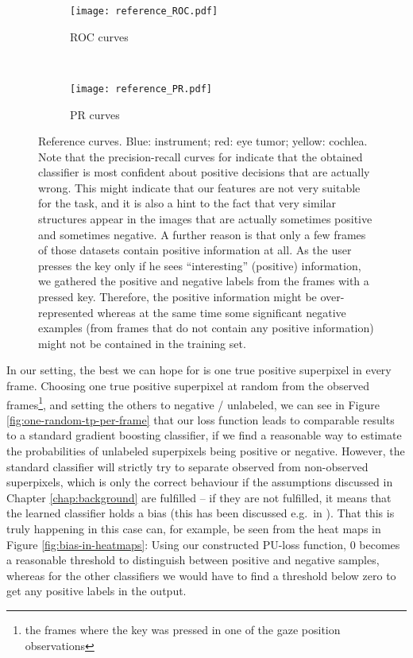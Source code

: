 \begin{figure}[ht]
	\centering
	\begin{subfigure}[h]{0.45\textwidth}
	\texttt{[image: reference\_ROC.pdf]}	
		\caption*{ROC curves}
	\end{subfigure}
	~
	\begin{subfigure}[h]{0.45\textwidth}
	\texttt{[image: reference\_PR.pdf]}	
		\caption*{PR curves}
	\end{subfigure}
	\caption{Reference curves. Blue: instrument; red: eye tumor; yellow: cochlea. Note that the precision-recall curves for indicate that the obtained classifier is most confident about positive decisions that are actually wrong. This might indicate that our features are not very suitable for the task, and it is also a hint to the fact that very similar structures appear in the images that are actually sometimes positive and sometimes negative. A further reason is that only a few frames of those datasets contain positive information at all. As the user presses the key only if he sees ``interesting'' (positive) information, we gathered the positive and negative labels from the frames with a pressed key. Therefore, the positive information might be over-represented whereas at the same time some significant negative examples (from frames that do not contain any positive information) might not be contained in the training set.}
	\label{fig:loss-functions-comparisons}
\end{figure}

%

In our setting, the best we can hope for is one true positive superpixel in every frame. Choosing one true positive superpixel at random from the observed frames\footnote{the frames where the key was pressed in one of the gaze position observations}, and setting the others to negative / unlabeled, we can see in Figure \ref{fig:one-random-tp-per-frame} that our loss function leads to comparable results to a standard gradient boosting classifier, if we find a reasonable way to estimate the probabilities  of unlabeled superpixels being positive or negative. However, the standard classifier will strictly try to separate observed from non-observed superpixels, which is only the correct behaviour if the assumptions discussed in Chapter \ref{chap:background} are fulfilled -- if they are not fulfilled, it means that the learned classifier holds a bias (this has been discussed e.g.\ in ). That this is truly happening in this case can, for example, be seen from the heat maps in Figure \ref{fig:bias-in-heatmaps}: Using our constructed PU-loss function, 0 becomes a reasonable threshold to distinguish between positive and negative samples, whereas for the other classifiers we would have to find a threshold below zero to get any positive labels in the output.

